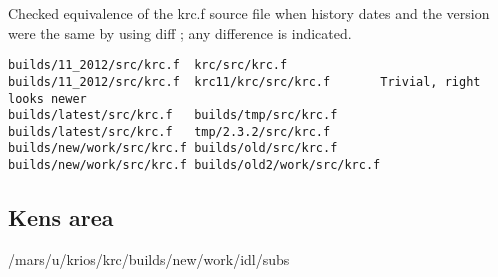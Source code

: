 \documentclass{article}
\begin{document}
Checked equivalence of the krc.f source file when history dates and the version were the same by using  diff ; any difference is indicated. 
\vspace{-3.mm} 
\begin{verbatim}
builds/11_2012/src/krc.f  krc/src/krc.f     
builds/11_2012/src/krc.f  krc11/krc/src/krc.f       Trivial, right looks newer
builds/latest/src/krc.f   builds/tmp/src/krc.f
builds/latest/src/krc.f   tmp/2.3.2/src/krc.f
builds/new/work/src/krc.f builds/old/src/krc.f
builds/new/work/src/krc.f builds/old2/work/src/krc.f
\end{verbatim} 

\subsection{Kens area}
/mars/u/krios/krc/builds/new/work/idl/subs
\end{document}
